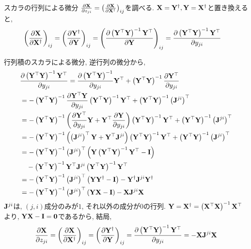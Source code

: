 \documentclass[dvipdfmx,notheorems,t]{beamer}
\begin{document}
\begin{frame}{スカラの行列による微分}
$\pdv{\vb{X}}{z_{ji}} = \left( \pdv{\vb{X}}{\vb{X}^\dagger} \right)_{ij}$を調べる.
$\vb{X} = \vb{Y}^\dagger, \vb{Y} = \vb{X}^\dagger$と置き換えると,
\begin{align*}
  \left( \pdv{\vb{X}}{\vb{X}^\dagger} \right)_{ij}
    &= \left( \pdv{\vb{Y}^\dagger}{\vb{Y}} \right)_{ij}
    = \left( \pdv{\left( \vb{Y}^\top \vb{Y} \right)^{-1} \vb{Y}^\top}{\vb{Y}} \right)_{ij}
    = \pdv{\left( \vb{Y}^\top \vb{Y} \right)^{-1} \vb{Y}^\top}{y_{ji}}
\end{align*}

行列積のスカラによる微分, 逆行列の微分から,
\begin{align*}
  & \pdv{\left( \vb{Y}^\top \vb{Y} \right)^{-1} \vb{Y}^\top}{y_{ji}}
    = \pdv{\left( \vb{Y}^\top \vb{Y} \right)^{-1}}{y_{ji}} \vb{Y}^\top
      + \left( \vb{Y}^\top \vb{Y} \right)^{-1} \pdv{\vb{Y}^\top}{y_{ji}} \\
    &= - \left( \vb{Y}^\top \vb{Y} \right)^{-1} \pdv{\vb{Y}^\top \vb{Y}}{y_{ji}}
      \left( \vb{Y}^\top \vb{Y} \right)^{-1} \vb{Y}^\top
      + \left( \vb{Y}^\top \vb{Y} \right)^{-1} \left( \vb{J}^{ji} \right)^\top \\
    &= - \left( \vb{Y}^\top \vb{Y} \right)^{-1}
      \left( \pdv{\vb{Y}^\top}{y_{ji}} \vb{Y} + \vb{Y}^\top \pdv{\vb{Y}}{y_{ji}} \right)
      \left( \vb{Y}^\top \vb{Y} \right)^{-1} \vb{Y}^\top
      + \left( \vb{Y}^\top \vb{Y} \right)^{-1} \left( \vb{J}^{ji} \right)^\top \\
    &= - \left( \vb{Y}^\top \vb{Y} \right)^{-1}
      \left( \left( \vb{J}^{ji} \right)^\top \vb{Y} + \vb{Y}^\top \vb{J}^{ji} \right)
      \left( \vb{Y}^\top \vb{Y} \right)^{-1} \vb{Y}^\top
      + \left( \vb{Y}^\top \vb{Y} \right)^{-1} \left( \vb{J}^{ji} \right)^\top \\
    &= - \left( \vb{Y}^\top \vb{Y} \right)^{-1} \left( \vb{J}^{ji} \right)^\top
      \left( \vb{Y} \left( \vb{Y}^\top \vb{Y} \right)^{-1} \vb{Y}^\top - \vb{I} \right) \\
      & \quad - \left( \vb{Y}^\top \vb{Y} \right)^{-1} \vb{Y}^\top \vb{J}^{ji}
      \left( \vb{Y}^\top \vb{Y} \right)^{-1} \vb{Y}^\top \\
    &= - \left( \vb{Y}^\top \vb{Y} \right)^{-1} \left( \vb{J}^{ji} \right)^\top
      \left( \vb{Y} \vb{Y}^\dagger - \vb{I} \right)
      - \vb{Y}^\dagger \vb{J}^{ji} \vb{Y}^\dagger \\
    &= - \left( \vb{Y}^\top \vb{Y} \right)^{-1} \left( \vb{J}^{ji} \right)^\top
      \left( \vb{Y} \vb{X} - \vb{I} \right) - \vb{X} \vb{J}^{ji} \vb{X}
\end{align*}
$\vb{J}^{ji}$は, $(j, i)$成分のみが$1$, それ以外の成分が$0$の行列.
$\vb{Y} = \vb{X}^\dagger = \left( \vb{X}^\top \vb{X} \right)^{-1} \vb{X}^\top$より,
$\vb{Y} \vb{X} - \vb{I} = \vb{0}$であるから, 結局,
\begin{align*}
  \pdv{\vb{X}}{z_{ji}} = \left( \pdv{\vb{X}}{\vb{X}^\dagger} \right)_{ij}
    = \left( \pdv{\vb{Y}^\dagger}{\vb{Y}} \right)_{ij}
    = \pdv{\left( \vb{Y}^\top \vb{Y} \right)^{-1} \vb{Y}^\top}{y_{ji}}
    = -\vb{X} \vb{J}^{ji} \vb{X}
\end{align*}
\newpage


\end{frame}
\end{document}
